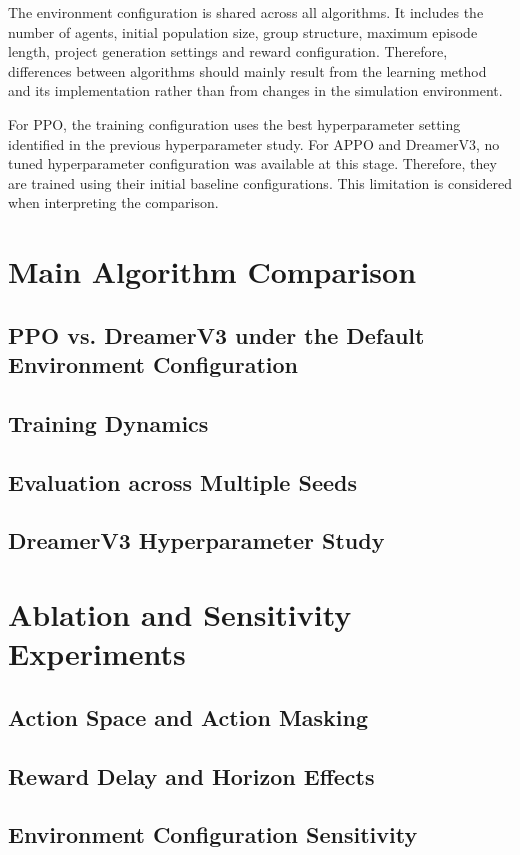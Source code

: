 \documentclass[english,bachelor]{hsluthesis}
\begin{document}
The environment configuration is shared across all algorithms. It includes the number of agents, initial population size, group structure, maximum episode length, project generation settings and reward configuration. Therefore, differences between algorithms should mainly result from the learning method and its implementation rather than from changes in the simulation environment.

For PPO, the training configuration uses the best hyperparameter setting identified in the previous hyperparameter study. For APPO and DreamerV3, no tuned hyperparameter configuration was available at this stage. Therefore, they are trained using their initial baseline configurations. This limitation is considered when interpreting the comparison.

\section{Main Algorithm Comparison}
\subsection{PPO vs. DreamerV3 under the Default Environment Configuration}
\subsection{Training Dynamics}
\subsection{Evaluation across Multiple Seeds}


\subsection{DreamerV3 Hyperparameter Study}



\section{Ablation and Sensitivity Experiments}
\subsection{Action Space and Action Masking}
\subsection{Reward Delay and Horizon Effects}
\subsection{Environment Configuration Sensitivity}
\end{document}
